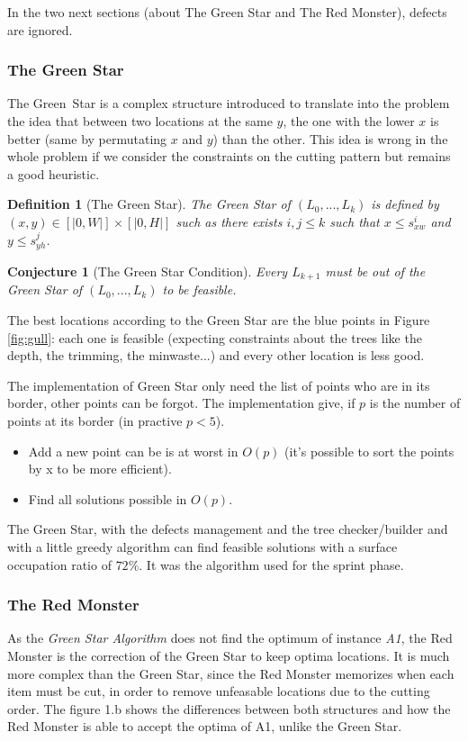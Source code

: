 \documentclass{article}
\newtheorem{definition}{Definition}
\newtheorem{conjecture}{Conjecture}
\begin{document}
    In the two next sections (about The Green Star and The Red Monster), defects are ignored.

        \subsubsection{The Green Star}

The Green Star is a complex structure introduced to translate into the problem the idea that between two locations at the same $y$, the one with the lower $x$ is better (same by permutating $x$ and $y$) than the other. This idea is wrong in the whole problem if we consider the constraints on the cutting pattern but remains a good heuristic.

\begin{definition}[The Green Star]
    The Green Star of $(L_0, ..., L_k)$ is defined by $ (x, y) \in [|0, W|]\times[|0, H|]$ such as there exists $i, j \leq k$ such that $x \leq s^i_{xw}$ and $y \leq s^j_{yh}$.
\end{definition}

\begin{conjecture}[The Green Star Condition]
    Every $L_{k + 1}$ must be out of the Green Star of $(L_0, ..., L_k)$ to be feasible.
\end{conjecture}

The best locations according to the Green Star are the blue points in Figure \ref{fig:gull}: each one is feasible (expecting constraints about the trees like the depth, the trimming, the minwaste...) and every other location is less good.

The implementation of Green Star only need the list of points who are in its border, other points can be forgot. The implementation give, if $p$ is the number of points at its border (in practive $p < 5$).
\begin{itemize}
    \item Add a new point can be is at worst in $O(p)$ (it's possible to sort the points by x to be more efficient).
    \item Find all solutions possible in $O(p)$.
\end{itemize}

The Green Star, with the defects management and the tree checker/builder and with a little greedy algorithm can find feasible solutions with a surface occupation ratio of $72\%$. It was the algorithm used for the sprint phase.

        \subsubsection{The Red Monster}
As the \textit{Green Star Algorithm} does not find the optimum of instance \textit{A1}, the Red Monster is the correction of the Green Star to keep optima locations. It is much more complex than the Green Star, since the Red Monster memorizes when each item must be cut, in order to remove unfeasable locations due to the cutting order.
The figure 1.b shows the differences between both structures and how the Red Monster is able to accept the optima of A1, unlike the Green Star.
\end{document}
